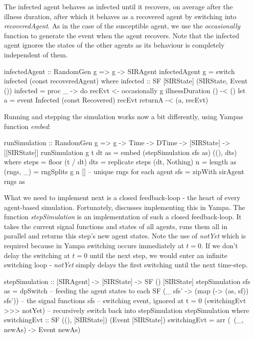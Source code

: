The infected agent behaves as infected until it recovers, on average after the illness duration, after which it behaves as a recovered agent by switching into \textit{recoveredAgent}. As in the case of the susceptible agent, we use the \textit{occasionally} function to generate the event when the agent recovers. Note that the infected agent ignores the states of the other agents as its behaviour is completely independent of them.

\begin{HaskellCode}
infectedAgent :: RandomGen g => g -> SIRAgent
infectedAgent g = switch infected (const recoveredAgent)
  where
    infected :: SF [SIRState] (SIRState, Event ())
    infected = proc _ -> do
      recEvt <- occasionally g illnessDuration () -< ()
      let a = event Infected (const Recovered) recEvt
      returnA -< (a, recEvt)
\end{HaskellCode}

Running and stepping the simulation works now a bit differently, using Yampas function \textit{embed}:

\begin{HaskellCode}
runSimulation :: RandomGen g 
  => g -> Time -> DTime -> [SIRState] -> [[SIRState]]
runSimulation g t dt as 
    = embed (stepSimulation sfs as) ((), dts)
  where
    steps     = floor (t / dt)
    dts       = replicate steps (dt, Nothing)
    n         = length as
    (rngs, _) = rngSplits g n [] -- unique rngs for each agent
    sfs       = zipWith sirAgent rngs as
\end{HaskellCode}

What we need to implement next is a closed feedback-loop - the heart of every agent-based simulation. Fortunately, \cite{nilsson_functional_2002, courtney_yampa_2003} discusses implementing this in Yampa. The function \textit{stepSimulation} is an implementation of such a closed feedback-loop. It takes the current signal functions and states of all agents, runs them all in parallel and returns this step's new agent states. Note the use of \textit{notYet} which is required because in Yampa switching occurs immediately at $t = 0$. If we don't delay the switching at $t = 0$ until the next step, we would enter an infinite switching loop - \textit{notYet} simply delays the first switching until the next time-step.

\begin{HaskellCode}
stepSimulation :: [SIRAgent] -> [SIRState] -> SF () [SIRState]
stepSimulation sfs as =
    dpSwitch
      -- feeding the agent states to each SF
      (\_ sfs' -> (map (\sf -> (as, sf)) sfs'))
      -- the signal functions
      sfs
      -- switching event, ignored at t = 0         
      (switchingEvt >>> notYet)
      -- recursively switch back into stepSimulation         
      stepSimulation                            
  where
    switchingEvt :: SF ((), [SIRState]) (Event [SIRState])
    switchingEvt = arr (\ (_, newAs) -> Event newAs)
\end{HaskellCode}

